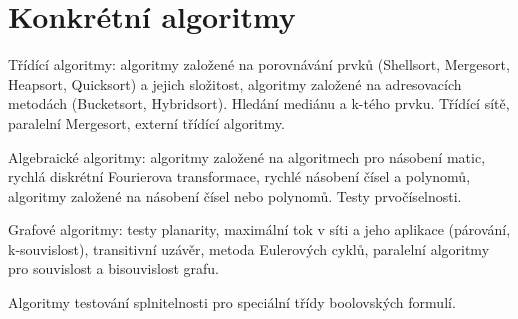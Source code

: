 \newpage
\section{Konkrétní algoritmy}
\begin{pozadavky}
\begin{pitemize}
\item Třídící algoritmy: algoritmy založené na porovnávání prvků (Shellsort, Mergesort, Heapsort, Quicksort) a jejich složitost, algoritmy založené na adresovacích metodách (Bucketsort, Hybridsort). Hledání mediánu a k-tého prvku. Třídící sítě, paralelní Mergesort, externí třídící algoritmy.
\item Algebraické algoritmy: algoritmy založené na algoritmech pro násobení matic, rychlá diskrétní Fourierova transformace, rychlé násobení čísel a polynomů, algoritmy založené na násobení čísel nebo polynomů. Testy prvočíselnosti.
\item Grafové algoritmy: testy planarity, maximální tok v síti a jeho aplikace (párování, k-souvislost), transitivní uzávěr, metoda Eulerových cyklů, paralelní algoritmy pro souvislost a bisouvislost grafu.
\item Algoritmy testování splnitelnosti pro speciální třídy boolovských formulí.
\end{pitemize}
\end{pozadavky}
